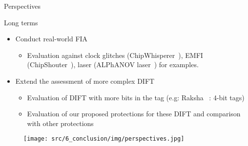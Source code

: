 \begin{frame}{Perspectives}
    \begin{block}{Long terms}
        \begin{itemize}
            [triangle]
            \item Conduct real-world FIA
                \begin{itemize}
                    \item Evaluation against clock glitches (ChipWhisperer~\cite{chipwhisperer}), EMFI (ChipShouter~\cite{chipshouter}), laser (ALPhANOV laser~\cite{alphanov-fourLFI}) for examples.
                \end{itemize}
            \item Extend the assessment of more complex DIFT
                \begin{itemize}
                    \item Evaluation of DIFT with more bits in the tag (e.g: Raksha~\cite{DKK-07-sigarch} : 4-bit tags)
                    \item Evaluation of our proposed protections for these DIFT and comparison with other protections
                \end{itemize}
        \end{itemize}
    \end{block}

    \begin{figure}
        \centering
        \texttt{[image: src/6\_conclusion/img/perspectives.jpg]}
    \end{figure}
\end{frame}
